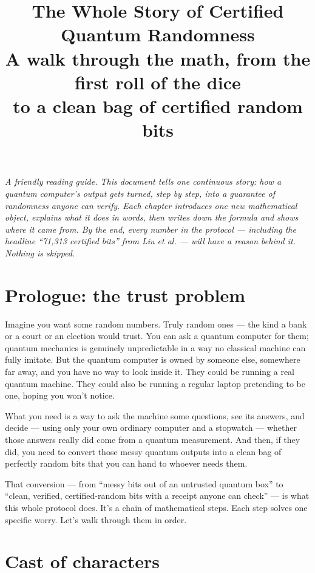 \documentclass[11pt]{article}
\title{\textbf{The Whole Story of Certified Quantum Randomness} \\
       \large A walk through the math, from the first roll of the dice \\ to a clean bag of certified random bits}
\author{}
\date{}
\newenvironment{aside}{\par\medskip\noindent\itshape\small\color{black!70}}{\normalfont\par\medskip}
\begin{document}
\maketitle

\begin{aside}
A friendly reading guide. This document tells one continuous story: how a quantum computer's output gets turned, step by step, into a guarantee of randomness anyone can verify. Each chapter introduces one new mathematical object, explains what it does in words, then writes down the formula and shows where it came from. By the end, every number in the protocol --- including the headline ``71{,}313 certified bits'' from Liu et al. --- will have a reason behind it. Nothing is skipped.
\end{aside}

\section*{Prologue: the trust problem}

Imagine you want some random numbers. Truly random ones --- the kind a bank or a court or an election would trust. You can ask a quantum computer for them; quantum mechanics is genuinely unpredictable in a way no classical machine can fully imitate. But the quantum computer is owned by someone else, somewhere far away, and you have no way to look inside it. They could be running a real quantum machine. They could also be running a regular laptop pretending to be one, hoping you won't notice.

What you need is a way to ask the machine some questions, see its answers, and decide --- using only your own ordinary computer and a stopwatch --- whether those answers really did come from a quantum measurement. And then, if they did, you need to convert those messy quantum outputs into a clean bag of perfectly random bits that you can hand to whoever needs them.

That conversion --- from ``messy bits out of an untrusted quantum box'' to ``clean, verified, certified-random bits with a receipt anyone can check'' --- is what this whole protocol does. It's a chain of mathematical steps. Each step solves one specific worry. Let's walk through them in order.

\section*{Cast of characters}
\end{document}
